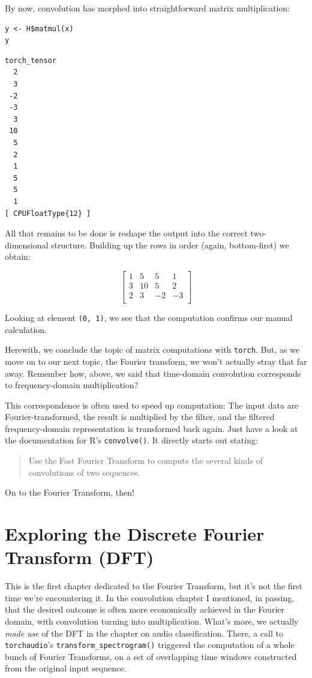 \documentclass[
  letterpaper,
]{krantz}
\begin{document}
By now, convolution has morphed into straightforward matrix
multiplication:

\begin{verbatim}
y <- H$matmul(x)
y
\end{verbatim}

\begin{verbatim}
torch_tensor
  2
  3
 -2
 -3
  3
 10
  5
  2
  1
  5
  5
  1
[ CPUFloatType{12} ]
\end{verbatim}

All that remains to be done is reshape the output into the correct
two-dimensional structure. Building up the rows in order (again,
bottom-first) we obtain:

\[
\begin{bmatrix}
  1 & 5 & 5 & 1\\
  3 & 10 & 5 & 2\\
  2 & 3 & -2 & -3\\
\end{bmatrix}
\]

Looking at element \texttt{(0,\ 1)}, we see that the computation
confirms our manual calculation.

Herewith, we conclude the topic of matrix computations with
\texttt{torch}. But, as we move on to our next topic, the Fourier
transform, we won't actually stray that far away. Remember how, above,
we said that time-domain convolution corresponds to frequency-domain
multiplication?

This correspondence is often used to speed up computation: The input
data are Fourier-transformed, the result is multiplied by the filter,
and the filtered frequency-domain representation is transformed back
again. Just have a look at the documentation for R's
\texttt{convolve()}. It directly starts out stating:

\begin{quote}
Use the Fast Fourier Transform to compute the several kinds of
convolutions of two sequences.
\end{quote}

On to the Fourier Transform, then!

\hypertarget{sec:signal-processing-1}{%
\chapter{Exploring the Discrete Fourier Transform
(DFT)}\label{sec:signal-processing-1}}

This is the first chapter dedicated to the Fourier Transform, but it's
not the first time we're encountering it. In the convolution chapter I
mentioned, in passing, that the desired outcome is often more
economically achieved in the Fourier domain, with convolution turning
into multiplication. What's more, we actually \emph{made} \emph{use} of
the DFT in the chapter on audio classification. There, a call to
\texttt{torchaudio}'s \texttt{transform\_spectrogram()} triggered the
computation of a whole bunch of Fourier Transforms, on a set of
overlapping time windows constructed from the original input sequence.
\end{document}
